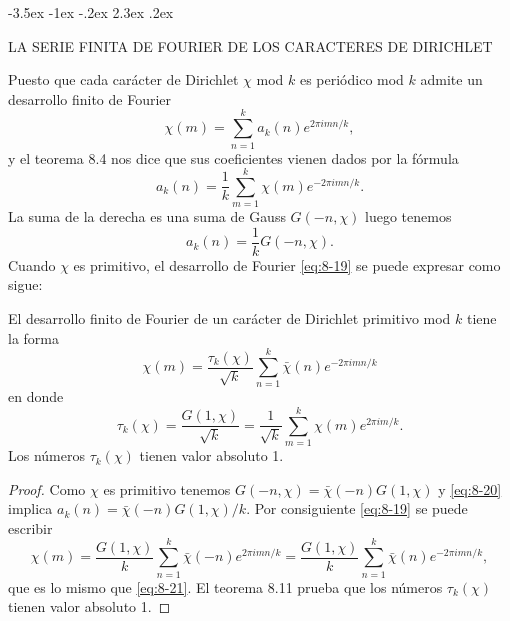 \documentclass[12pt,a4paper]{book}
\makeatletter
\renewcommand\section{\@startsection{section}{1}{\z@}%
  {-3.5ex \@plus -1ex \@minus -.2ex}%
  {2.3ex \@plus .2ex}%
  {\normalfont\Large\bfseries\raggedright}}
\makeatother
\begin{document}
    \section{LA SERIE FINITA DE FOURIER DE LOS CARACTERES DE DIRICHLET}

    Puesto que cada carácter de Dirichlet $\chi$ mod $k$ es periódico mod $k$ admite un
    desarrollo finito de Fourier
    \begin{equation}\label{eq:8-19}
        \chi(m)=\sum_{n=1}^{k}a_{k}(n)e^{2\pi imn/k},
    \end{equation}
    y el teorema 8.4 nos dice que sus coeficientes vienen dados por la fórmula
    \begin{equation*}
        a_{k}(n)=\frac{1}{k}\sum_{m=1}^{k}\chi(m)e^{-2\pi imn/k}.
    \end{equation*}
    La suma de la derecha es una suma de Gauss $G(-n,\chi)$ luego tenemos
    \begin{equation}\label{eq:8-20}
        a_{k}(n)=\frac{1}{k}G(-n,\chi).
    \end{equation}
    Cuando $\chi$ es primitivo, el desarrollo de Fourier \eqref{eq:8-19} se puede expresar
    como sigue:

    \begin{teorema}
        El desarrollo finito de Fourier de un carácter de Dirichlet primitivo mod $k$ tiene
        la forma
        \begin{equation}\label{eq:8-21}
            \chi(m)=\frac{\tau_{k}(\chi)}{\sqrt{k}}\sum_{n=1}^{k}\bar{\chi}(n)e^{-2\pi imn/k}
        \end{equation}
        en donde
        \begin{equation}\label{eq:8-22}
            \tau_{k}(\chi)=\frac{G(1,\chi)}{\sqrt{k}}=\frac{1}{\sqrt{k}}\sum_{m=1}^{k}\chi(m)e^{2\pi im/k}.
        \end{equation}
        Los números $\tau_{k}(\chi)$ tienen valor absoluto 1.
    \end{teorema}

    \begin{proof}
        Como $\chi$ es primitivo tenemos $G(-n,\chi)=\bar{\chi}(-n)G(1,\chi)$ y
        \eqref{eq:8-20} implica $a_{k}(n)=\bar{\chi}(-n)G(1,\chi)/k$. Por consiguiente
        \eqref{eq:8-19} se puede escribir
        \begin{equation*}
            \chi(m)=\frac{G(1,\chi)}{k}\sum_{n=1}^{k}\bar{\chi}(-n)e^{2\pi imn/k}
            =\frac{G(1,\chi)}{k}\sum_{n=1}^{k}\bar{\chi}(n)e^{-2\pi imn/k},
        \end{equation*}
        que es lo mismo que \eqref{eq:8-21}. El teorema 8.11 prueba que los números
        $\tau_{k}(\chi)$ tienen valor absoluto 1.
    \end{proof}
\end{document}
